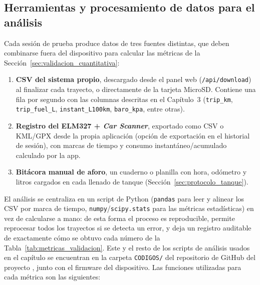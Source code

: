 \subsection{Herramientas y procesamiento de datos para el análisis}
\label{sec:herramientas_analisis}

Cada sesión de prueba produce datos de tres fuentes distintas, que deben combinarse fuera del dispositivo para calcular las métricas de la Sección~\ref{sec:validacion_cuantitativa}:

\begin{enumerate}
	\item \textbf{CSV del sistema propio}, descargado desde el panel web (\texttt{/api/download}) al finalizar cada trayecto, o directamente de la tarjeta MicroSD. Contiene una fila por segundo con las columnas descritas en el Capítulo~3 (\texttt{trip\_km}, \texttt{trip\_fuel\_L}, \texttt{instant\_L100km}, \texttt{baro\_kpa}, entre otras).
	\item \textbf{Registro del ELM327 + \textit{Car Scanner}}, exportado como CSV o KML/GPX desde la propia aplicación (opción de exportación en el historial de sesión), con marcas de tiempo y consumo instantáneo/acumulado calculado por la app.
	\item \textbf{Bitácora manual de aforo}, un cuaderno o planilla con hora, odómetro y litros cargados en cada llenado de tanque (Sección~\ref{sec:protocolo_tanque}).
\end{enumerate}

El análisis se centraliza en un script de Python (\texttt{pandas} para leer y alinear los CSV por marca de tiempo, \texttt{numpy}/\texttt{scipy.stats} para las métricas estadísticas) en vez de calcularse a mano: de esta forma el proceso es reproducible, permite reprocesar todos los trayectos si se detecta un error, y deja un registro auditable de exactamente cómo se obtuvo cada número de la Tabla~\ref{tab:metricas_validacion}. Este y el resto de los scripts de análisis usados en el capítulo se encuentran en la carpeta \texttt{CODIGOS/} del repositorio de GitHub del proyecto \citep{CalleGitHub2026}, junto con el firmware del dispositivo. Las funciones utilizadas para cada métrica son las siguientes:

